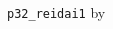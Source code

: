 \documentclass[dvipdfmx,papersize]{jsarticle}
\begin{document}
\verb|p32_reidai1| by \ketcindy
\vspace{5mm}

\begin{layerv}[25]{0}{0}
\end{layerv}
\end{document}
